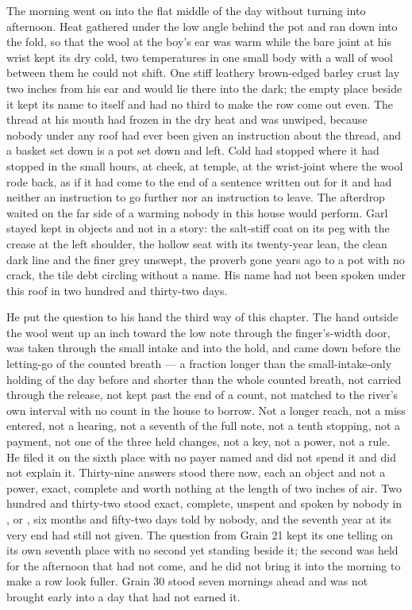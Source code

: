 The morning went on into the flat middle of the day without turning into afternoon. Heat gathered under the low angle behind the pot and ran down into the fold, so that the wool at the boy's ear was warm while the bare joint at his wrist kept its dry cold, two temperatures in one small body with a wall of wool between them he could not shift. One stiff leathery brown-edged barley crust lay two inches from his ear and would lie there into the dark; the empty place beside it kept its name to itself and had no third to make the row come out even. The thread at his mouth had frozen in the dry heat and was unwiped, because nobody under any roof had ever been given an instruction about the thread, and a basket set down is a pot set down and left. Cold had stopped where it had stopped in the small hours, at cheek, at temple, at the wrist-joint where the wool rode back, as if it had come to the end of a sentence written out for it and had neither an instruction to go further nor an instruction to leave. The afterdrop waited on the far side of a warming nobody in this house would perform. Garl stayed kept in objects and not in a story: the salt-stiff coat on its peg with the crease at the left shoulder, the hollow seat with its twenty-year lean, the clean dark line and the finer grey unswept, the proverb gone years ago to a pot with no crack, the tile debt circling without a name. His name had not been spoken under this roof in two hundred and thirty-two days.

He put the question to his hand the third way of this chapter. The hand outside the wool went up an inch toward the low note through the finger's-width door, was taken through the small intake and into the hold, and came down before the letting-go of the counted breath --- a fraction longer than the small-intake-only holding of the day before and shorter than the whole counted breath, not carried through the release, not kept past the end of a count, not matched to the river's own interval with no count in the house to borrow. Not a longer reach, not a miss entered, not a hearing, not a seventh of the full note, not a tenth stopping, not a payment, not one of the three held changes, not a key, not a power, not a rule. He filed it on the sixth place with no payer named and did not spend it and did not explain it. Thirty-nine answers stood there now, each an object and not a power, exact, complete and worth nothing at the length of two inches of air. Two hundred and thirty-two stood exact, complete, unspent and spoken by nobody in ,  or , six months and fifty-two days told by nobody, and the seventh year at its very end had still not given. The question from Grain 21 kept its one telling on its own seventh place with no second yet standing beside it; the second was held for the afternoon that had not come, and he did not bring it into the morning to make a row look fuller. Grain 30 stood seven mornings ahead and was not brought early into a day that had not earned it.

